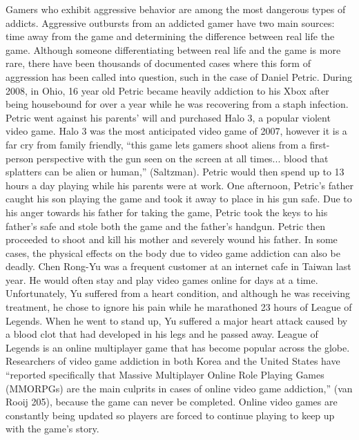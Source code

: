\documentclass[a4paper,man,natbib]{apa6}
\renewcommand{\paragraph}{}
\begin{document}
\paragraph{}
Gamers who exhibit aggressive behavior are among the most dangerous types of addicts. Aggressive outbursts from an addicted gamer have two main sources: time away from the game and determining the difference between real life the game. Although someone differentiating between real life and the game is more rare, there have been thousands of documented cases where this form of aggression has been called into question, such in the case of Daniel Petric. During 2008, in Ohio, 16 year old Petric became heavily addiction to his Xbox after being housebound for over a year while he was recovering from a staph infection. Petric went against his parents’ will and purchased Halo 3, a popular violent video game. Halo 3 was the most anticipated video game of 2007, however it is a far cry from family friendly, “this game lets gamers shoot aliens from a first-person perspective with the gun seen on the screen at all times... blood that splatters can be alien or human,” (Saltzman). Petric would then spend up to 13 hours a day playing while his parents were at work. One afternoon, Petric’s father caught his son playing the game and took it away to place in his gun safe. Due to his anger towards his father for taking the game, Petric took the keys to his father’s safe and stole both the game and the father’s handgun. Petric then proceeded to shoot and kill his mother and severely wound his father. 
\paragraph{}
In some cases, the physical effects on the body due to video game addiction can also be deadly. Chen Rong-Yu was a frequent customer at an internet cafe in Taiwan last year. He would often stay and play video games online for days at a time. Unfortunately, Yu suffered from a heart condition, and although he was receiving treatment, he chose to ignore his pain while he marathoned 23 hours of League of Legends. When he went to stand up, Yu suffered a major heart attack caused by a blood clot that had developed in his legs and he passed away. League of Legends is an online multiplayer game that has become popular across the globe. Researchers of video game addiction in both Korea and the United States have “reported specifically that Massive Multiplayer Online Role Playing Games (MMORPGs) are the main culprits in cases of online video game addiction,” (van Rooij 205), because the game can never be completed. Online video games are constantly being updated so players are forced to continue playing to keep up with the game’s story. 
\end{document}
